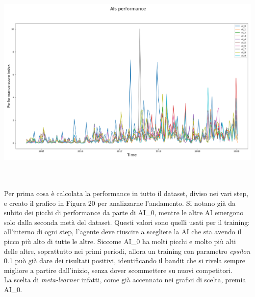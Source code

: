 \documentclass[a4paper,12pt]{report}
\begin{document}
\begin{fig}
\begin{fig}
	\begin{center}
		\includegraphics[width=\linewidth]{performance_ai_250}
	\end{center}
	\label{Figura 19}
\end{fig}
\\~\\Per prima cosa è calcolata la performance in tutto il dataset, diviso nei vari step, e creato il grafico in Figura 20 per analizzarne l'andamento. Si notano già da subito dei picchi di performance da parte di AI\_0, mentre le altre AI emergono solo dalla seconda metà del dataset. Questi valori sono quelli usati per il training: all'interno di ogni step, l'agente deve riuscire a scegliere la AI che sta avendo il picco più alto di tutte le altre. Siccome AI\_0 ha molti picchi e molto più alti delle altre, soprattutto nei primi periodi, allora un training con parametro \textit{epsilon} 0.1 può già dare dei risultati positivi, identificando il bandit che si rivela sempre migliore a partire dall'inizio, senza dover scommettere su nuovi competitori.\\ La scelta di \textit{meta-learner} infatti, come già accennato nei grafici di scelta, premia AI\_0.

\end{fig}
\end{document}
